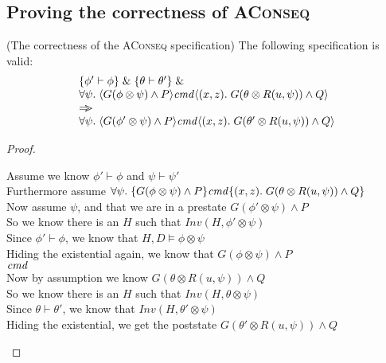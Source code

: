 \subsection{Proving the correctness of \textsc{AConseq}}



\begin{prop*}{(The correctness of the \textsc{AConseq} specification)}
The following specification is valid:
\begin{displaymath}
\begin{array}{l}
\{{\phi' \vdash \phi}\} \;\&\; \{{\theta \vdash \theta'}\} \;\&\; \\
\forall \psi.\; \langle{G(\phi \otimes \psi) \land P}\rangle{\mathit{cmd}}\langle{(x,z)}.\;{G(\theta\otimes R(u, \psi)) \land Q}\rangle \\
\Rightarrow\!\!\!> \\
\forall \psi.\; \langle{G(\phi' \otimes \psi) \land P}\rangle{\mathit{cmd}}\langle{(x,z)}.\;{G(\theta'\otimes R(u, \psi)) \land Q}\rangle  \\
\end{array}
\end{displaymath}
\end{prop*}

\begin{proof}
\begin{tabbedproof}
\oo Assume we know $\phi' \vdash \phi$ and $\psi \vdash \psi'$ \\
\oo Furthermore assume $\forall \psi.\; \{{G(\phi \otimes \psi) \land P}\}{\mathit{cmd}}\{{(x,z)}.\;{G(\theta\otimes R(u, \psi)) \land Q}\}$ \\
\ooo Now assume $\psi$, and that we are in a prestate $G(\phi' \otimes \psi) \land P$ \\
\ooo So we know there is an $H$ such that $\mathit{Inv}(H, \phi' \otimes \psi)$ \\
\ooo Since $\phi' \vdash \phi$, we know that $H, D \models \phi \otimes \psi$ \\
\ooo Hiding the existential again, we know that $G(\phi \otimes \psi) \land P$ \\
\ooo $\mathit{cmd}$ \\
\ooo Now by assumption we know $G(\theta \otimes R(u, \psi)) \land Q$ \\
\ooo So we know there is an $H$ such that $\mathit{Inv}(H, \theta \otimes \psi)$ \\
\ooo Since $\theta \vdash \theta'$, we know that $\mathit{Inv}(H, \theta' \otimes \psi)$ \\
\ooo Hiding the existential, we get the poststate $G(\theta'\otimes R(u, \psi)) \land Q$ \\
\end{tabbedproof}
\end{proof}

